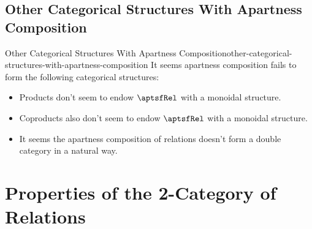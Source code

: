 \subsection{Other Categorical Structures With Apartness Composition}\label{subsection-other-categorical-structures-with-apartness-composition}
\begin{remark}{Other Categorical Structures With Apartness Composition}{other-categorical-structures-with-apartness-composition}%
    It seems apartness composition fails to form the following categorical structures:
    \begin{itemize}
        \item\label{other-categorical-structures-with-apartness-composition-monoidal-category-with-products}Products don't seem to endow $\aptsfRel$ with a monoidal structure.
        \item\label{other-categorical-structures-with-apartness-composition-monoidal-category-with-coproducts}Coproducts also don't seem to endow $\aptsfRel$ with a monoidal structure.
        \item\label{other-categorical-structures-with-apartness-composition-double-categorical-structure}It seems the apartness composition of relations doesn't form a double category in a natural way.
    \end{itemize}
\end{remark}
\section{Properties of the 2-Category of Relations}\label{section-properties-of-the-2-category-of-relations}
